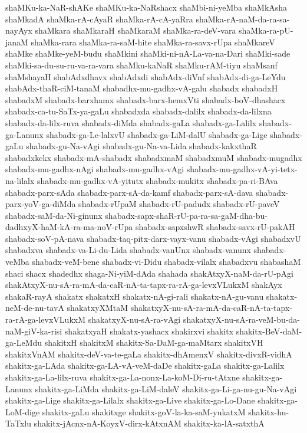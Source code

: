 {shaMKu-ka-NaR-shAKe
shaMKu-ka-NaRshacx
shaMbi-ni-yeMba
shaMkAsha
shaMkadA
shaMka-rA-cAyaR
shaMka-rA-cA-yaRra
shaMka-rA-naM-da-ra-sa-nayAyx
shaMkara
shaMkaraH
shaMkaraM
shaMka-ra-deV-vara
shaMka-ra-pU-janaM
shaMka-rara
shaMka-ra-saM-hite
shaMka-ra-savx-rUpa
shaMkareV
shaMke
shaMke-yeM-budu
shaMkini
shaMki-ni-nA-La-va-na-Dari
shaMki-sade
shaMki-sa-du-su-ru-va-ra-vara
shaMku-kaNaR
shaMku-rAM-tiyu
shaMsanf
shaMshayaH
shabAdxdhavx
shabAdxdi
shabAdx-diVnf
shabAdx-di-ga-LeYdu
shabAdx-thaR-ciM-tanaM
shabadhx-mu-gadhx-vA-galu
shabadx
shabadxH
shabadxM
shabadx-barxhamx
shabadx-barx-hemxVti
shabadx-boV-dhashacx
shabadx-ca-tu-SaTx-ya-gaLu
shabadxda
shabadx-dalilx
shabadx-da-lilxna
shabadx-da-lilx-ruva
shabadx-diMda
shabadx-gaLa
shabadx-ga-Lalilx
shabadx-ga-Lanunx
shabadx-ga-Le-lalxvU
shabadx-ga-LiM-dalU
shabadx-ga-Lige
shabadx-gaLu
shabadx-gu-Na-vAgi
shabadx-gu-Na-va-Lida
shabadx-kakxthaR
shabadxkekx
shabadx-mA-shabadx
shabadxmaM
shabadxmuM
shabadx-mugadhx
shabadx-mu-gadhx-nAgi
shabadx-mu-gadhx-vAgi
shabadx-mu-gadhx-vA-yi-tetx-na-lilalx
shabadx-mu-gadhx-vA-yitutx
shabadx-mukitx
shabadx-pa-ri-BAva
shabadx-parx-sAda
shabadx-parx-sA-da-kamf
shabadx-parx-sA-dava
shabadx-parx-yoV-ga-diMda
shabadx-rUpaM
shabadx-rU-padudx
shabadx-rU-paveV
shabadx-saM-da-Ni-ginunx
shabadx-sapx-shaR-rU-pa-ra-sa-gaM-dha-bu-dadhxyX-haM-kA-ra-ma-noV-rUpa
shabadx-sapxshwR
shabadx-savx-rU-pakAH
shabadx-soV-pA-nava
shabadx-taq-pitx-darx-vayx-vanu
shabadx-vAgi
shabadxvU
shabadxva
shabadx-va-Li-du-Lida
shabadx-vanUnx
shabadx-vanunx
shabadx-veMba
shabadx-veM-bene
shabadx-vi-Didu
shabadx-vilalx
shabadxvu
shabashaM
shaci
shacx
shadedhx
shaga-Ni-yiM-dAda
shahada
shakAtxyX-naM-da-rU-pAgi
shakAtxyX-nu-sA-ra-mA-da-caR-nA-ta-tapx-ra-rA-ga-levxVLukxM
shakAyx
shakaR-rayA
shakatx
shakatxH
shakatx-nA-gi-rali
shakatx-nA-gu-vanu
shakatx-neM-de-nu-tavA
shakatxyXMtaM
shakatxyX-nu-sA-ra-mA-da-caR-nA-ta-tapx-ra-rA-ga-levxVLukxM
shakatxyX-nu-sA-ra-vAgi
shakatxyX-nu-sA-ra-veM-bu-da-naM-giV-ka-risi
shakatxyaH
shakatx-yashacx
shakirxvi
shakitx
shakitx-BeV-daM-ga-LeMdu
shakitxH
shakitxM
shakitx-Sa-DaM-ga-maMtarx
shakitxVH
shakitxVnAM
shakitx-deV-va-te-gaLa
shakitx-dhAmenxV
shakitx-divxR-vidhA
shakitx-ga-LAda
shakitx-ga-LA-vA-veM-daDe
shakitx-gaLa
shakitx-ga-Lalilx
shakitx-ga-La-lilx-ruva
shakitx-ga-La-nonx-La-koM-Di-ru-tAtxne
shakitx-ga-Lanunx
shakitx-ga-LiMda
shakitx-ga-LiM-daleV
shakitx-ga-Li-ga-nu-gu-Na-vAgi
shakitx-ga-Lige
shakitx-ga-Lilalx
shakitx-ga-Live
shakitx-ga-Lo-Dane
shakitx-ga-LoM-dige
shakitx-gaLu
shakitxge
shakitx-goV-la-ka-saM-yukatxM
shakitx-hu-TaTxlu
shakitx-jAcnx-nA-KoyxV-dirx-kAtxnAM
shakitx-ka-lA-satxthA
}
